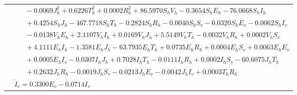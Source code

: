 \documentclass[9pt]{article}
\numberwithin{equation}{section}
\begin{document}
\begin{table}[ht]
\begin{tabularx}{1\linewidth}{|l|X|}
        & $\quad\;\;-0.0069J_h^2+0.6226T_h^2+0.0002R_h^2+86.5970S_hV_h-0.3654S_hE_h-76.0668S_hI_h$ \\
        & $\quad\;\;+0.4254S_hJ_h-467.7718S_hT_h-0.2824S_hR_h-0.0040S_hS_v-0.0320S_hE_v-0.0062S_hI_v$ \\
        & $\quad\;\;-0.0138V_hE_h+2.1107V_hI_h+0.0169V_hJ_h+5.5149V_hT_h-0.0032V_hR_h+0.0002V_hS_v$ \\
        & $\quad\;\;+4.1111E_hI_h-1.3581E_hJ_h-63.7935E_hT_h+0.0735E_hR_h+0.0004E_hS_v+0.0063E_hE_v$ \\
        & $\quad\;\;+0.0005E_hI_v-0.0307I_hJ_h+0.7028I_hT_h-0.0111I_hR_h+0.0002I_hS_v-60.6075J_hT_h$ \\
        & $\quad\;\;+0.2632J_hR_h-0.0019J_hS_v-0.0213J_hE_v-0.0042J_hI_v+0.0003T_hR_h$ \\
        & $\dot{I}_v=0.3300E_v-0.0714I_v$ \\
        \hline
    \end{tabularx}
\end{table}

\clearpage


\end{document}
